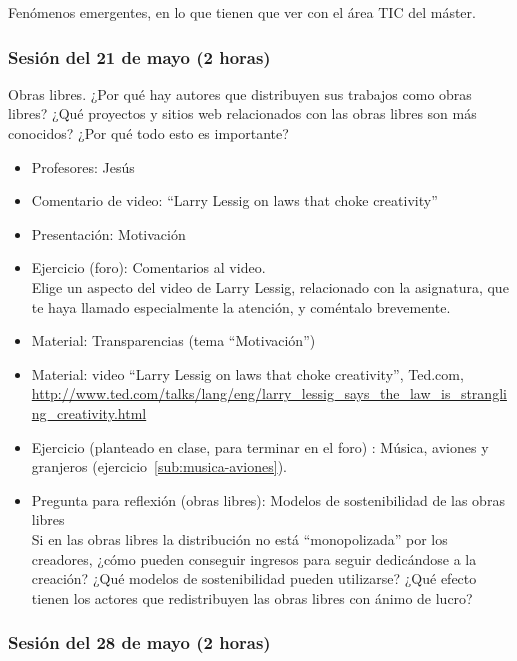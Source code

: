 \documentclass[a4paper,12pt]{article}
\begin{document}
Fenómenos emergentes, en lo que tienen que ver con el área TIC del máster.

\subsubsection{Sesión del 21 de mayo (2 horas)}

Obras libres. ¿Por qué hay autores que distribuyen sus trabajos como obras libres? ¿Qué proyectos y sitios web relacionados con las obras libres son más conocidos? ¿Por qué todo esto es importante?

\begin{itemize}
\item Profesores: Jesús
\item Comentario de video: ``Larry Lessig on laws that choke creativity''
\item Presentación: Motivación
\item Ejercicio (foro): Comentarios al video. \\
  Elige un aspecto del video de Larry Lessig, relacionado con la asignatura, que te haya llamado especialmente la atención, y coméntalo brevemente.
\item Material: Transparencias (tema ``Motivación'')
\item Material: video ``Larry Lessig on laws that choke creativity'', Ted.com, \\
  \url{http://www.ted.com/talks/lang/eng/larry_lessig_says_the_law_is_strangling_creativity.html}
\item Ejercicio (planteado en clase, para terminar en el foro) : Música, aviones y granjeros (ejercicio~\ref{sub:musica-aviones}).
\item Pregunta para reflexión (obras libres): Modelos de sostenibilidad de las obras libres \\
  Si en las obras libres la distribución no está ``monopolizada'' por los creadores, ¿cómo pueden conseguir ingresos para seguir dedicándose a la creación? ¿Qué modelos de sostenibilidad pueden utilizarse? ¿Qué efecto tienen los actores que redistribuyen las obras libres con ánimo de lucro?
 \end{itemize}

\subsubsection{Sesión del 28 de mayo (2 horas)}
\end{document}
